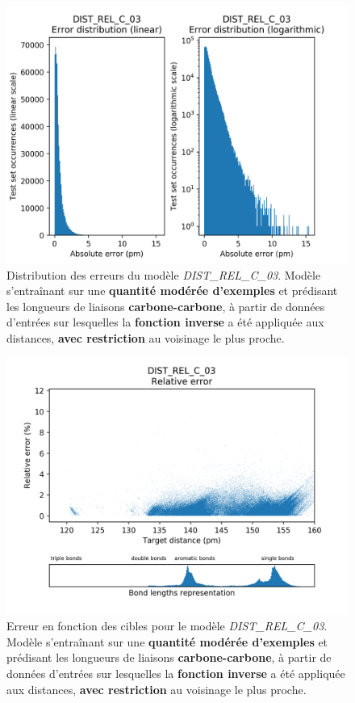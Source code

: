 \begin{figure}[!h]
	\centering
	
	\includegraphics[scale=0.75]{../figures/DIST_REL_C_03/DIST_REL_C_03_distrib_rmse_val.png}	
	
	\caption{Distribution des erreurs du modèle \emph{DIST\_REL\_C\_03}. Modèle s'entraînant sur une \textbf{quantité modérée d'exemples} et prédisant les longueurs de liaisons \textbf{carbone-carbone}, à partir de données d'entrées sur lesquelles la \textbf{fonction inverse} a été appliquée aux distances, \textbf{avec restriction} au voisinage le plus proche.}
\end{figure}
\begin{figure}[!h]
	\centering
	
	\includegraphics[scale=0.75]{../figures/DIST_REL_C_03/DIST_REL_C_03_distrib_rmse_dist.png}	
	
	\caption{Erreur en fonction des cibles pour le modèle \emph{DIST\_REL\_C\_03}. Modèle s'entraînant sur une \textbf{quantité modérée d'exemples} et prédisant les longueurs de liaisons \textbf{carbone-carbone}, à partir de données d'entrées sur lesquelles la \textbf{fonction inverse} a été appliquée aux distances, \textbf{avec restriction} au voisinage le plus proche.}
	\end{figure}


